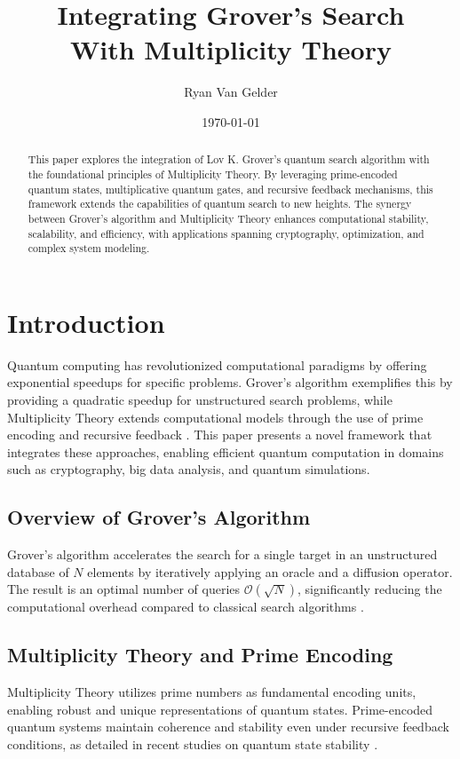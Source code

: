 \documentclass{article}
\title{Integrating Grover's Search\\ With Multiplicity Theory}
\author{Ryan Van Gelder}
\affil{Citizen Gardens - The Foundation of Multiplicity \\ \texttt{ryan@citizengardens.org}}
\date{\today}
\theoremstyle{plain}
\begin{document}
\maketitle

\begin{abstract}
This paper explores the integration of Lov K. Grover's quantum search algorithm with the foundational principles of Multiplicity Theory. By leveraging prime-encoded quantum states, multiplicative quantum gates, and recursive feedback mechanisms, this framework extends the capabilities of quantum search to new heights. The synergy between Grover's algorithm and Multiplicity Theory enhances computational stability, scalability, and efficiency, with applications spanning cryptography, optimization, and complex system modeling.
\end{abstract}

\section{Introduction}
Quantum computing has revolutionized computational paradigms by offering exponential speedups for specific problems. Grover's algorithm \cite{grover1996} exemplifies this by providing a quadratic speedup for unstructured search problems, while Multiplicity Theory extends computational models through the use of prime encoding and recursive feedback \cite{berkowitz2021, ricks2004}. This paper presents a novel framework that integrates these approaches, enabling efficient quantum computation in domains such as cryptography, big data analysis, and quantum simulations.

\subsection{Overview of Grover's Algorithm}
Grover's algorithm accelerates the search for a single target in an unstructured database of \(N\) elements by iteratively applying an oracle and a diffusion operator. The result is an optimal number of queries \(\mathcal{O}(\sqrt{N})\), significantly reducing the computational overhead compared to classical search algorithms \cite{grover1996}.

\subsection{Multiplicity Theory and Prime Encoding}
Multiplicity Theory utilizes prime numbers as fundamental encoding units, enabling robust and unique representations of quantum states. Prime-encoded quantum systems maintain coherence and stability even under recursive feedback conditions, as detailed in recent studies on quantum state stability \cite{berkowitz2021, hardy1916}.
\end{document}
